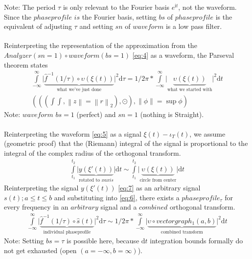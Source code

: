 \documentclass{report}
\newcommand\norm[1]{\left\lVert#1\right\rVert}
\begin{document}
Note: The period $\tau$ is only relevant to the Fourier basis $e^{\mathrm{i}t}$, not the waveform. Since the $phaseprofile$ $is$ the Fourier basis, setting $bs$ of $phaseprofile$ is the equivalent of adjusting $\tau$ and setting $sn$ of $waveform$ is a low pass filter.\\\\
Reinterpreting the representation of the approximation from the $Analyzer(sn=1) \circ waveform(bs=1)$ \eqref{eq:4} as a waveform, the Parseval theorem states
\begin{align}
\int\limits_{-\infty}^{\infty} \lvert \underbrace{\hat{f}^{-1}(1/\tau)\circ \upsilon(\xi (t))}_{\text{what we've just done}}\rvert ^2 \mathrm{d}\tau = 1/2\pi * \int\limits_{-\infty}^{\infty} \lvert \underbrace{\upsilon (\xi (t))}_{\text{what we started with}} \rvert ^2 \mathrm{d}t\label{eq:6}\\
(((\int \int,\norm{z}=\norm{r}_2),\odot),\norm{\phi}= \sup \phi)
\end{align}
Note: $waveform$ $bs=1$ (perfect) and $sn=1$ (nothing is Straight).\\\\
Reinterpreting the waveform \eqref{eq:5} as a signal $\xi (t) - \iota_{T}(t)$, we assume (geometric proof) that the (Riemann) integral of the signal is proportional to the integral of the complex radius of the orthogonal transform.
\begin{align}
\int\limits_{t_{1}}^{t_{2}} \lvert \underbrace{y(\xi '(t))}_{\text{rotated to }xaxis}\rvert \mathrm{d} t \sim \int\limits_{t_{1}}^{t_{2}} \lvert \underbrace{\upsilon (\xi (t))}_{\text{circle from center}} \rvert \mathrm{d}t\label{eq:7}
\end{align}
Reinterpreting the signal $y(\xi '(t))$ \eqref{eq:7} as an arbitrary signal $s(t);a \leq t \leq b$ and substituting into \eqref{eq:6}, there exists a $phaseprofile_{\tau}$ for every frequency in an $arbitrary$ signal and a $combined$ orthogonal transform.
\begin{align}
\int\limits_{-\infty}^{\infty} \lvert \underbrace{\hat{f}^{-1}(1/\tau)\circ \hat{s}(t)}_{\text{individual phaseprofile}}\rvert ^2 \mathrm{d}\tau \sim 1/2\pi * \int\limits_{-\infty}^{\infty} \lvert \underbrace{\upsilon \circ vectorgraph_{1}(a,b)}_{\text{combined transform}} \rvert ^2 \mathrm{d}t
\end{align}
Note: Setting $bs=\tau$ is possible here, because $\mathrm{d}t$ integration bounds formally do not get exhausted (open $(a=-\infty,b=\infty)$).\\\\
\end{document}
